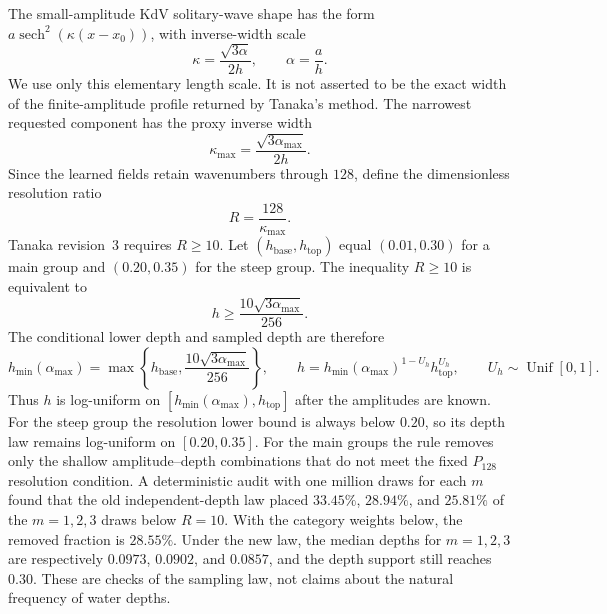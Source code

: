 \documentclass[11pt]{article}
\begin{document}
The small-amplitude KdV solitary-wave shape has the form
$a\operatorname{sech}^2(\kappa(x-x_0))$, with inverse-width scale
\begin{equation}
  \kappa=\frac{\sqrt{3\alpha}}{2h},
  \qquad \alpha=\frac ah.
\end{equation}
We use only this elementary length scale.  It is not asserted to be the exact
width of the finite-amplitude profile returned by Tanaka's method.  The
narrowest requested component has the proxy inverse width
\begin{equation}
  \kappa_{\max}=\frac{\sqrt{3\alpha_{\max}}}{2h}.
  \label{eq:tanaka-kdv-inverse-width}
\end{equation}
Since the learned fields retain wavenumbers through $128$, define the
dimensionless resolution ratio
\begin{equation}
  R=\frac{128}{\kappa_{\max}}.
  \label{eq:tanaka-resolution-ratio}
\end{equation}
Tanaka revision~3 requires $R\geq10$.  Let
$(h_{\mathrm{base}},h_{\mathrm{top}})$ equal $(0.01,0.30)$ for a main group
and $(0.20,0.35)$ for the steep group.  The inequality $R\geq10$ is equivalent
to
\begin{equation}
  h\geq \frac{10\sqrt{3\alpha_{\max}}}{256}.
\end{equation}
The conditional lower depth and sampled depth are therefore
\begin{equation}
  h_{\min}(\alpha_{\max})
  =\max\!\left\{h_{\mathrm{base}},
       \frac{10\sqrt{3\alpha_{\max}}}{256}\right\},
  \qquad
  h=h_{\min}(\alpha_{\max})^{1-U_h}h_{\mathrm{top}}^{U_h},
  \qquad U_h\sim\operatorname{Unif}[0,1].
  \label{eq:tanaka-conditional-depth-law}
\end{equation}
Thus $h$ is log-uniform on
$[h_{\min}(\alpha_{\max}),h_{\mathrm{top}}]$ after the amplitudes are known.
For the steep group the resolution lower bound is always below $0.20$, so its
depth law remains log-uniform on $[0.20,0.35]$.  For the main groups the rule
removes only the shallow amplitude--depth combinations that do not meet the
fixed $P_{128}$ resolution condition.  A deterministic audit with one million
draws for each $m$ found that the old independent-depth law placed $33.45\%$,
$28.94\%$, and $25.81\%$ of the $m=1,2,3$ draws below $R=10$.  With the
category weights below, the removed fraction is $28.55\%$.  Under the new law,
the median depths for $m=1,2,3$ are respectively $0.0973$, $0.0902$, and
$0.0857$, and the depth support still reaches $0.30$.  These are checks of the
sampling law, not claims about the natural frequency of water depths.
\end{document}
